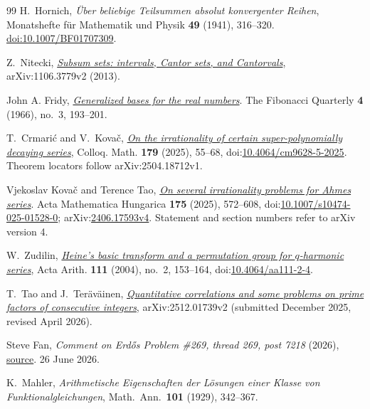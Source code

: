 \documentclass[11pt]{article}
\begin{document}
\begin{thebibliography}{99}
H.~Hornich,
\emph{\"Uber beliebige Teilsummen absolut konvergenter Reihen},
Monatshefte f\"ur Mathematik und Physik \textbf{49} (1941), 316--320.
\href{https://doi.org/10.1007/BF01707309}{doi:10.1007/BF01707309}.

 Z.~Nitecki,
  \href{https://arxiv.org/abs/1106.3779v2}{\emph{Subsum sets: intervals, Cantor
  sets, and Cantorvals}}, arXiv:1106.3779v2 (2013).

 John A. Fridy, \href{https://www.fq.math.ca/Scanned/4-3/fridy.pdf}{\emph{Generalized bases for the real numbers}}.
  The Fibonacci Quarterly \textbf{4} (1966), no.~3, 193--201.

 T.~Crmari\'{c} and V.~Kova\v{c},
  \href{https://arxiv.org/abs/2504.18712v1}
  {\emph{On the irrationality of certain super-polynomially decaying series}},
  Colloq. Math. \textbf{179} (2025), 55--68,
  doi:\href{https://doi.org/10.4064/cm9628-5-2025}{10.4064/cm9628-5-2025}.
  Theorem locators follow arXiv:2504.18712v1.

 Vjekoslav Kova\v{c} and Terence Tao, \href{https://arxiv.org/abs/2406.17593v4}{\emph{On several irrationality problems for Ahmes series}}.
  Acta Mathematica Hungarica \textbf{175} (2025), 572--608, doi:\href{https://doi.org/10.1007/s10474-025-01528-0}{10.1007/s10474-025-01528-0}; arXiv:\href{https://arxiv.org/abs/2406.17593v4}{2406.17593v4}. Statement and section numbers refer to arXiv version 4.

 W.~Zudilin,
  \href{https://geodesic.mathdoc.fr/articles/10.4064/aa111-2-4/}{\emph{Heine's
  basic transform and a permutation group for \(q\)-harmonic series}},
  Acta Arith. \textbf{111} (2004), no.~2, 153--164,
  doi:\href{https://doi.org/10.4064/aa111-2-4}{10.4064/aa111-2-4}.

 T.~Tao and J.~Ter\"av\"ainen,
  \href{https://arxiv.org/abs/2512.01739v2}{\emph{Quantitative correlations and
  some problems on prime factors of consecutive integers}}, arXiv:2512.01739v2
  (submitted December 2025, revised April 2026).

 Steve Fan,
  \emph{Comment on Erd\H{o}s Problem \#269, thread 269, post 7218} (2026),
  \href{https://www.erdosproblems.com/forum/thread/269#post-7218}{source}. 26 June 2026.

 K.~Mahler, \emph{Arithmetische Eigenschaften der L\"osungen
  einer Klasse von Funktionalgleichungen}, Math.\ Ann.\ \textbf{101} (1929),
  342--367.


\end{thebibliography}
\end{document}
